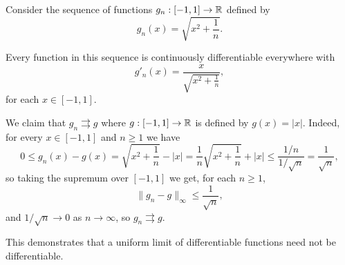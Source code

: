 \documentclass[../analysis1.tex]{subfiles}
\begin{document}
\begin{example}
    Consider the sequence of functions $g_n:[-1,1] \to \mathbb{R}$ defined by
    \[
        g_n(x) = \sqrt{x^2+\frac{1}{n}}.
    \]

    \begin{center}
    \end{center}

    Every function in this sequence is continuously differentiable everywhere with \[g'_n(x)=\frac{x}{\sqrt{x^2+\frac{1}{n}}},\]
    for each $x\in[-1,1]$.

    We claim that $g_n\rightrightarrows g$ where $g:[-1,1]\to\mathbb{R}$ is defined by $g(x)=|x|$. Indeed, for every $x\in[-1,1]$ and $n\ge 1$ we have
    \[0\le g_n(x)-g(x)=\sqrt{x^2+\frac{1}{n}}-|x|=\frac{1}{n}{\sqrt{x^2+\frac{1}{n}}+|x|}\le \frac{1/n}{1/\sqrt{n}}=\frac{1}{\sqrt{n}},\]
    so taking the supremum over $[-1,1]$ we get, for each $n\ge 1$,
    \[\|g_n-g\|_\infty \le\frac{1}{\sqrt{n}},\]
    and $1/\sqrt{n}\to 0$ as $n\to\infty$, so $g_n\rightrightarrows g$.
    
    This demonstrates that a uniform limit of differentiable functions need not be differentiable.
\end{example}
\end{document}
